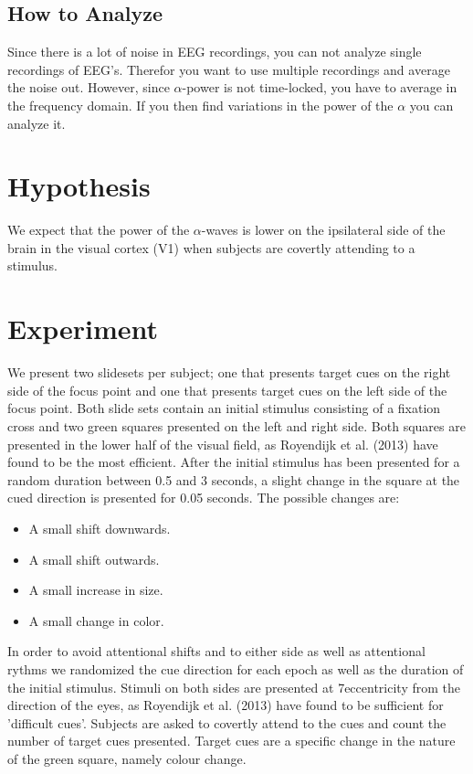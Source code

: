 \documentclass{article}
\begin{document}
\subsection{How to Analyze}
Since there is a lot of noise in EEG recordings, you can not analyze single
recordings of EEG's. Therefor you want to use multiple recordings and average
the noise out. However, since $\alpha$-power is not time-locked, you have to
average in the frequency domain. If you then find variations in the power of
the $\alpha$ you can analyze it.


\section{Hypothesis} 
We expect that the power of the $\alpha$-waves is lower on
the ipsilateral side of the brain in the visual cortex (V1) when subjects are
covertly attending to a stimulus.

\section{Experiment} 
We present two slidesets per subject; one that presents
target cues on the right side of the focus point and one that presents target
cues on the left side of the focus point. Both slide sets contain an initial
stimulus consisting of a fixation cross and two green squares presented on the
left and right side. Both squares are presented in the lower half of the visual
field, as Royendijk et al. (2013) have found to be the most efficient. After
the initial stimulus has been presented for a random duration between 0.5 and 3
seconds, a slight change in the square at the cued direction is presented for
0.05 seconds. 
The possible changes are: 
\begin{itemize} 
	\item A small shift downwards.  
	\item A small shift outwards.  
	\item A small increase in size.
  \item A small change in color.  
\end{itemize} In order to avoid attentional
	shifts and to either side as well as attentional rythms we randomized the cue
	direction for each epoch as well as the duration of the initial stimulus.
	Stimuli on both sides are presented at 7\degree eccentricity from the
	direction of the eyes, as Royendijk et al. (2013) have found to be sufficient
	for 'difficult cues'.  Subjects are asked to covertly attend to the cues and
	count the number of target cues presented. Target cues are a specific change
	in the nature of the green square, namely colour change. 
\end{document}
